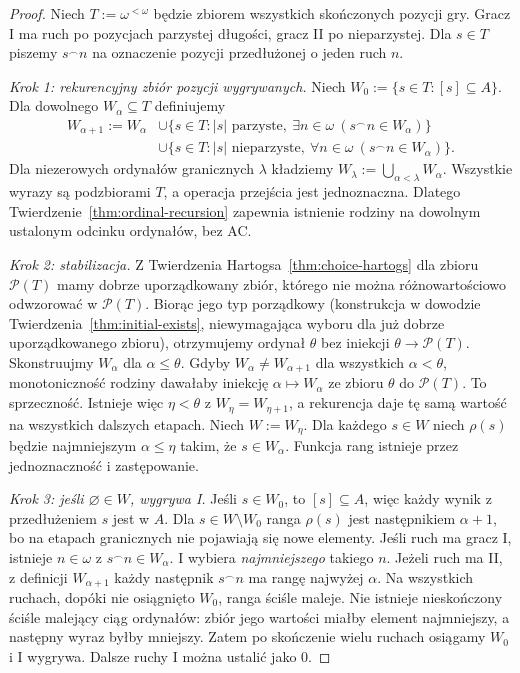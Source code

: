\begin{proof}
Niech $T:=\omega^{<\omega}$ będzie zbiorem
wszystkich skończonych pozycji gry.
Gracz I ma ruch po pozycjach parzystej
długości, gracz II po nieparzystej.
Dla $s\in T$ piszemy
$s^\frown n$ na oznaczenie pozycji
przedłużonej o jeden ruch $n$.

\emph{Krok 1: rekurencyjny zbiór pozycji wygrywanych.}
Niech
$W_0:=\{s\in T:[s]\subseteq A\}$.
Dla dowolnego $W_\alpha\subseteq T$
definiujemy
\[
\begin{split}
W_{\alpha+1}:=W_\alpha
 &\cup\{s\in T:|s|\text{ parzyste},
       \ \exists n\in\omega\
                    (s^\frown n\in W_\alpha)\}\\
 &\cup\{s\in T:|s|\text{ nieparzyste},
       \ \forall n\in\omega\
                    (s^\frown n\in W_\alpha)\}.
\end{split}
\]
Dla niezerowych ordynałów granicznych
$\lambda$ kładziemy
$W_\lambda:=\bigcup_{\alpha<\lambda}W_\alpha$.
Wszystkie wyrazy są podzbiorami $T$,
a operacja przejścia jest jednoznaczna.
Dlatego Twierdzenie~\ref{thm:ordinal-recursion}
zapewnia istnienie rodziny na dowolnym
ustalonym odcinku ordynałów, bez AC.

\emph{Krok 2: stabilizacja.}
Z Twierdzenia Hartogsa~\ref{thm:choice-hartogs}
dla zbioru $\mathcal P(T)$ mamy
dobrze uporządkowany zbiór, którego nie
można różnowartościowo odwzorować
w $\mathcal P(T)$. Biorąc jego
typ porządkowy (konstrukcja w dowodzie
Twierdzenia~\ref{thm:initial-exists},
niewymagająca wyboru dla już
dobrze uporządkowanego zbioru),
otrzymujemy ordynał $\theta$
bez iniekcji $\theta\to\mathcal P(T)$.
Skonstruujmy $W_\alpha$ dla
$\alpha\le\theta$.
Gdyby $W_\alpha\ne W_{\alpha+1}$
dla wszystkich $\alpha<\theta$,
monotoniczność rodziny dawałaby
iniekcję
$\alpha\mapsto W_\alpha$
ze zbioru $\theta$ do $\mathcal P(T)$.
To sprzeczność.
Istnieje więc $\eta<\theta$
z $W_\eta=W_{\eta+1}$,
a rekurencja daje tę samą wartość
na wszystkich dalszych etapach.
Niech $W:=W_\eta$.
Dla każdego $s\in W$ niech
$\rho(s)$ będzie najmniejszym
$\alpha\le\eta$ takim, że
$s\in W_\alpha$.
Funkcja rang istnieje przez
jednoznaczność i zastępowanie.

\emph{Krok 3: jeśli $\varnothing\in W$,
wygrywa I.}
Jeśli $s\in W_0$, to
$[s]\subseteq A$, więc każdy
wynik z przedłużeniem $s$ jest w $A$.
Dla $s\in W\setminus W_0$
ranga $\rho(s)$ jest następnikiem
$\alpha+1$, bo na etapach granicznych
nie pojawiają się nowe elementy.
Jeśli ruch ma gracz I,
istnieje $n\in\omega$
z $s^\frown n\in W_\alpha$.
I wybiera \emph{najmniejszego}
takiego $n$.
Jeżeli ruch ma II, z definicji
$W_{\alpha+1}$ każdy następnik
$s^\frown n$ ma rangę najwyżej $\alpha$.
Na wszystkich ruchach, dopóki
nie osiągnięto $W_0$, ranga ściśle maleje.
Nie istnieje nieskończony ściśle malejący
ciąg ordynałów: zbiór jego wartości
miałby element najmniejszy,
a następny wyraz byłby mniejszy.
Zatem po skończenie wielu ruchach
osiągamy $W_0$ i I wygrywa.
Dalsze ruchy I można ustalić jako $0$.


\end{proof}
